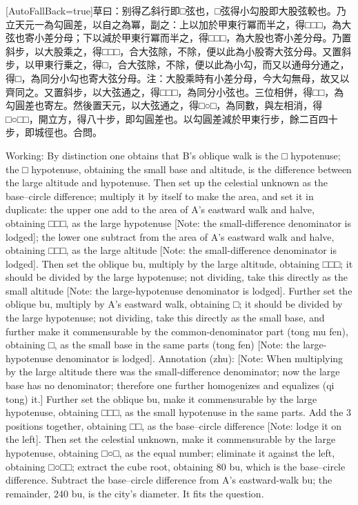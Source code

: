 \documentclass[11pt]{article}
\newcommand{\zhsmall}{\footnotesize\color{black!70}}
\newcommand{\unitlabel}[1]{\marginpar{\raggedleft\tiny\color{gray}#1}}
\newenvironment{unitzh}{\par\CJKfontspec{Noto Serif CJK SC}[AutoFallBack=true]\large\linespread{1.25}\selectfont}{\par}
\newenvironment{uniten}{\par\small\color{black!85}}{\par\medskip}
\begin{document}
\begin{unitzh}\unitlabel{ceyuan-018.14}草曰：别得乙斜行即□弦也，□弦得小勾股即大股弦較也。乃立天元一為勾圓差，以自之為冪，副之：上以加於甲東行冪而半之，得□□□，為大弦也{\zhsmall 寄小差分母}；下以減於甲東行冪而半之，得□□□，為大股也{\zhsmall 寄小差分母}。乃置斜步，以大股乘之，得□□□，合大弦除，不除，便以此為小股{\zhsmall 寄大弦分母}。又置斜步，以甲東行乗之，得□，合大弦除，不除，便以此為小勾，而又以通母分通之，得□，為同分小勾也{\zhsmall 寄大弦分母}。注：{\zhsmall 大股乘時有小差分母，今大勾無母，故又以齊同之。}又置斜步，以大弦通之，得□□□，為同分小弦也。三位相併，得□□，為勾圓差也{\zhsmall 寄左}。然後置天元，以大弦通之，得□○□，為同數，與左相消，得□○□□，開立方，得八十步，即勾圓差也。以勾圓差減於甲東行步，餘二百四十步，即城徑也。合問。\end{unitzh}
\begin{uniten}Working: By distinction one obtains that B's oblique walk is the □ hypotenuse; the □ hypotenuse, obtaining the small base and altitude, is the difference between the large altitude and hypotenuse. Then set up the celestial unknown as the base–circle difference; multiply it by itself to make the area, and set it in duplicate: the upper one add to the area of A's eastward walk and halve, obtaining □□□, as the large hypotenuse [Note: the small-difference denominator is lodged]; the lower one subtract from the area of A's eastward walk and halve, obtaining □□□, as the large altitude [Note: the small-difference denominator is lodged]. Then set the oblique bu, multiply by the large altitude, obtaining □□□; it should be divided by the large hypotenuse; not dividing, take this directly as the small altitude [Note: the large-hypotenuse denominator is lodged]. Further set the oblique bu, multiply by A's eastward walk, obtaining □; it should be divided by the large hypotenuse; not dividing, take this directly as the small base, and further make it commensurable by the common-denominator part (tong mu fen), obtaining □, as the small base in the same parts (tong fen) [Note: the large-hypotenuse denominator is lodged]. Annotation (zhu): [Note: When multiplying by the large altitude there was the small-difference denominator; now the large base has no denominator; therefore one further homogenizes and equalizes (qi tong) it.] Further set the oblique bu, make it commensurable by the large hypotenuse, obtaining □□□, as the small hypotenuse in the same parts. Add the 3 positions together, obtaining □□, as the base–circle difference [Note: lodge it on the left]. Then set the celestial unknown, make it commensurable by the large hypotenuse, obtaining □○□, as the equal number; eliminate it against the left, obtaining □○□□; extract the cube root, obtaining 80 bu, which is the base–circle difference. Subtract the base–circle difference from A's eastward-walk bu; the remainder, 240 bu, is the city's diameter. It fits the question.\end{uniten}
\end{document}

